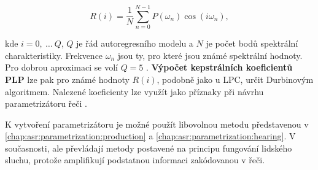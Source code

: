 \begin{equation}
  R\left(i\right) = \frac{1}{N} \sum_{n=0}^{N-1} P\left(\omega_n\right) \cos\left(i\omega_n\right),
  \label{eq:asr:plp:error:solution}
\end{equation}

\noindent kde $i = 0,\ \dots\ Q$, $Q$ je řád autoregresního modelu a $N$ je počet bodů spektrální charakteristiky. Frekvence $\omega_n$ jsou ty, pro které jsou známé spektrální hodnoty. Pro dobrou aproximaci se volí $Q = 5$ \cite{Benesty2007}. \textbf{Výpočet kepstrálních koeficientů PLP} lze pak pro známé hodnoty $R\left(i\right)$, podobně jako u LPC, určit Durbinovým algoritmem. Nalezené koeficienty lze využít jako příznaky při návrhu parametrizátoru řeči
\cite{Holmes2001}.

K vytvoření parametrizátoru je možné použít libovolnou metodu představenou v \ref{chap:asr:parametrization:production} a \ref{chap:asr:parametrization:hearing}. V současnosti, ale převládají metody postavené na principu fungování lidského sluchu, protože amplifikují podstatnou informaci zakódovanou v řeči.
